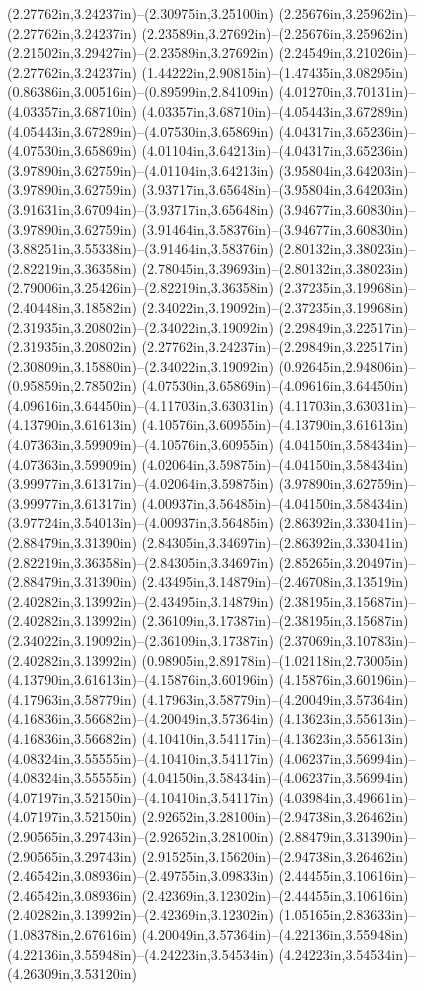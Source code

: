(2.27762in,3.24237in)--(2.30975in,3.25100in) (2.25676in,3.25962in)--(2.27762in,3.24237in) (2.23589in,3.27692in)--(2.25676in,3.25962in) (2.21502in,3.29427in)--(2.23589in,3.27692in) (2.24549in,3.21026in)--(2.27762in,3.24237in) (1.44222in,2.90815in)--(1.47435in,3.08295in) (0.86386in,3.00516in)--(0.89599in,2.84109in) (4.01270in,3.70131in)--(4.03357in,3.68710in) (4.03357in,3.68710in)--(4.05443in,3.67289in) (4.05443in,3.67289in)--(4.07530in,3.65869in) (4.04317in,3.65236in)--(4.07530in,3.65869in) (4.01104in,3.64213in)--(4.04317in,3.65236in) (3.97890in,3.62759in)--(4.01104in,3.64213in) (3.95804in,3.64203in)--(3.97890in,3.62759in) (3.93717in,3.65648in)--(3.95804in,3.64203in) (3.91631in,3.67094in)--(3.93717in,3.65648in) (3.94677in,3.60830in)--(3.97890in,3.62759in) (3.91464in,3.58376in)--(3.94677in,3.60830in) (3.88251in,3.55338in)--(3.91464in,3.58376in) (2.80132in,3.38023in)--(2.82219in,3.36358in) (2.78045in,3.39693in)--(2.80132in,3.38023in) (2.79006in,3.25426in)--(2.82219in,3.36358in) (2.37235in,3.19968in)--(2.40448in,3.18582in) (2.34022in,3.19092in)--(2.37235in,3.19968in) (2.31935in,3.20802in)--(2.34022in,3.19092in) (2.29849in,3.22517in)--(2.31935in,3.20802in) (2.27762in,3.24237in)--(2.29849in,3.22517in) (2.30809in,3.15880in)--(2.34022in,3.19092in) (0.92645in,2.94806in)--(0.95859in,2.78502in) (4.07530in,3.65869in)--(4.09616in,3.64450in) (4.09616in,3.64450in)--(4.11703in,3.63031in) (4.11703in,3.63031in)--(4.13790in,3.61613in) (4.10576in,3.60955in)--(4.13790in,3.61613in) (4.07363in,3.59909in)--(4.10576in,3.60955in) (4.04150in,3.58434in)--(4.07363in,3.59909in) (4.02064in,3.59875in)--(4.04150in,3.58434in) (3.99977in,3.61317in)--(4.02064in,3.59875in) (3.97890in,3.62759in)--(3.99977in,3.61317in) (4.00937in,3.56485in)--(4.04150in,3.58434in) (3.97724in,3.54013in)--(4.00937in,3.56485in) (2.86392in,3.33041in)--(2.88479in,3.31390in) (2.84305in,3.34697in)--(2.86392in,3.33041in) (2.82219in,3.36358in)--(2.84305in,3.34697in) (2.85265in,3.20497in)--(2.88479in,3.31390in) (2.43495in,3.14879in)--(2.46708in,3.13519in) (2.40282in,3.13992in)--(2.43495in,3.14879in) (2.38195in,3.15687in)--(2.40282in,3.13992in) (2.36109in,3.17387in)--(2.38195in,3.15687in) (2.34022in,3.19092in)--(2.36109in,3.17387in) (2.37069in,3.10783in)--(2.40282in,3.13992in) (0.98905in,2.89178in)--(1.02118in,2.73005in) (4.13790in,3.61613in)--(4.15876in,3.60196in) (4.15876in,3.60196in)--(4.17963in,3.58779in) (4.17963in,3.58779in)--(4.20049in,3.57364in) (4.16836in,3.56682in)--(4.20049in,3.57364in) (4.13623in,3.55613in)--(4.16836in,3.56682in) (4.10410in,3.54117in)--(4.13623in,3.55613in) (4.08324in,3.55555in)--(4.10410in,3.54117in) (4.06237in,3.56994in)--(4.08324in,3.55555in) (4.04150in,3.58434in)--(4.06237in,3.56994in) (4.07197in,3.52150in)--(4.10410in,3.54117in) (4.03984in,3.49661in)--(4.07197in,3.52150in) (2.92652in,3.28100in)--(2.94738in,3.26462in) (2.90565in,3.29743in)--(2.92652in,3.28100in) (2.88479in,3.31390in)--(2.90565in,3.29743in) (2.91525in,3.15620in)--(2.94738in,3.26462in) (2.46542in,3.08936in)--(2.49755in,3.09833in) (2.44455in,3.10616in)--(2.46542in,3.08936in) (2.42369in,3.12302in)--(2.44455in,3.10616in) (2.40282in,3.13992in)--(2.42369in,3.12302in) (1.05165in,2.83633in)--(1.08378in,2.67616in) (4.20049in,3.57364in)--(4.22136in,3.55948in) (4.22136in,3.55948in)--(4.24223in,3.54534in) (4.24223in,3.54534in)--(4.26309in,3.53120in) 